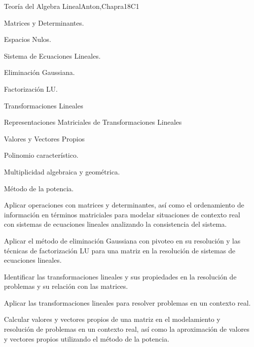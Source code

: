 \begin{syllabus}
 \begin{unit}{Teoría del Algebra Lineal}{}{Anton,Chapra}{18}{C1}
   \begin{topics}
       \item Matrices y Determinantes.
       \item Espacios Nulos.
       \item Sistema de Ecuaciones Lineales.
         \begin{subtopics}
           \item Eliminación Gaussiana.
           \item Factorización LU.
         \end{subtopics}
       \item Transformaciones Lineales
         \begin{subtopics}
           \item Representaciones Matriciales de Transformaciones Lineales
         \end{subtopics}
       \item Valores y Vectores Propios
         \begin{subtopics}
           \item Polinomio característico.
           \item Multiplicidad algebraica y geométrica.
           \item Método de la potencia.
         \end{subtopics}
    \end{topics}
 
    \begin{learningoutcomes}
       \item Aplicar operaciones con matrices y determinantes, así como el ordenamiento de información en términos matriciales para modelar situaciones de contexto real con sistemas de ecuaciones lineales analizando la consistencia del sistema.
       \item Aplicar el método de eliminación Gaussiana con pivoteo en su resolución y las técnicas de factorización LU para una matriz en la resolución de sistemas de ecuaciones lineales.
       \item Identificar las transformaciones lineales y sus propiedades en la resolución de problemas y su relación con las matrices.
       \item Aplicar las transformaciones lineales para resolver problemas en un contexto real.
       \item Calcular valores y vectores propios de una matriz en el modelamiento y resolución de problemas en un contexto real, así como la aproximación de valores y vectores propios utilizando el método de la potencia.
    \end{learningoutcomes}
 \end{unit}
 

\end{syllabus}
